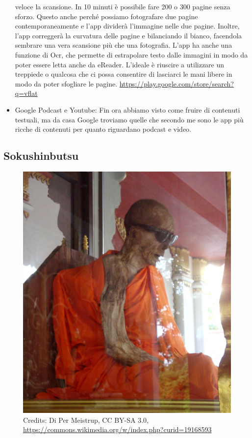 \documentclass[12pt]{book} %
\begin{document}
\begin{itemize}
veloce la scansione. In 10 minuti è possibile fare 200 o 300 pagine senza sforzo. Questo anche perché possiamo
fotografare due pagine contemporaneamente e l'app dividerà l'immagine nelle
due pagine. Inoltre, l'app correggerà la curvatura delle pagine e bilanciando il bianco, facendola
sembrare una vera scansione più che una fotografia. L'app ha anche una funzione di Ocr, che
permette di estrapolare testo dalle immagini in modo da poter essere letta anche da eReader.
L'ideale è riuscire a utilizzare un treppiede o qualcosa che ci possa consentire di lasciarci le
mani libere in modo da poter sfogliare le pagine. \protect\url{https://play.google.com/store/search?q=vflat} 
\item Google Podcast e Youtube: Fin ora abbiamo visto come fruire di contenuti testuali, ma da casa Google troviamo
quelle che secondo me sono le app più ricche di contenuti per quanto riguardano podcast e video.
\end{itemize}
\subsection{Sokushinbutsu}

\begin{figure}
  \centering
  \includegraphics[width=0.95\linewidth]{images/Libro-img042.jpg}
  \begin{minipage}{\linewidth}
    \caption{Credits: Di Per Meistrup, CC BY-SA 3.0, \protect\url{https://commons.wikimedia.org/w/index.php?curid=19168593}}
  \end{minipage}
\end{figure}
\end{document}
